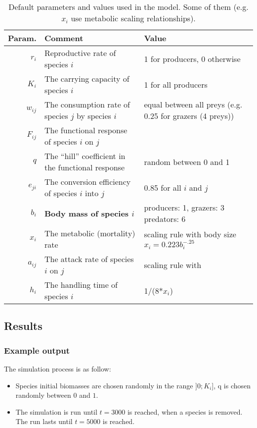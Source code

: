 \documentclass[a4paper,11pt]{article}
\begin{document}
    \begin{sidewaystable}[s]
      \begin{tabular}{r | l | l}
        Param.    & Comment                                               & Value  \\
        \hline 
        $r_i$     & Reproductive rate of species $i$                      & 1 for producers, 0 otherwise \\
        $K_i$     & The carrying capacity of species $i$                  & 1 for all producers \\
        $w_{ij}$  & The consumption rate of species $j$ by species $i$    & equal between all preys (e.g. 0.25 for grazers (4 preys)) \\
        $F_{ij}$  & The functional response of species $i$ on $j$         & \\
        $q$       & The ``hill'' coefficient in the functional response   & random between 0 and 1 \\
        $e_{ji}$  & The conversion efficiency of species $i$ into $j$     & 0.85 for all $i$ and $j$ \\
        $b_{i}$   & \textbf{Body mass of species $i$}                     & producers: 1, grazers: 3 predators: 6 \\
        $x_i$     & The metabolic (mortality) rate                        & scaling rule with body size $x_i = 0.223 b_i^{-.25}$ \\
        $a_{ij}$  & The attack rate of species $i$ on $j$                 & scaling rule with \\
        $h_i$     & The handling time of species $i$                      & 1/(8*$x_i$) 
      \end{tabular}
      \caption{Default parameters and values used in the model. Some of them 
(e.g. $x_i$ use metabolic scaling relationships). }
      \label{tab:parameters}
    \end{sidewaystable}
    
    \subsection{Results}
      \subsubsection{Example output}
      
        The simulation process is as follow: 
        \begin{itemize}
          \item Species initial biomasses are chosen randomly in the range 
                $]0;K_i]$, q is chosen randomly between $0$ and $1$.
          \item The simulation is run until $t=3000$ is reached, when a species 
                is removed. The run lasts until $t=5000$ is reached. 
        \end{itemize}
        
\end{document}
